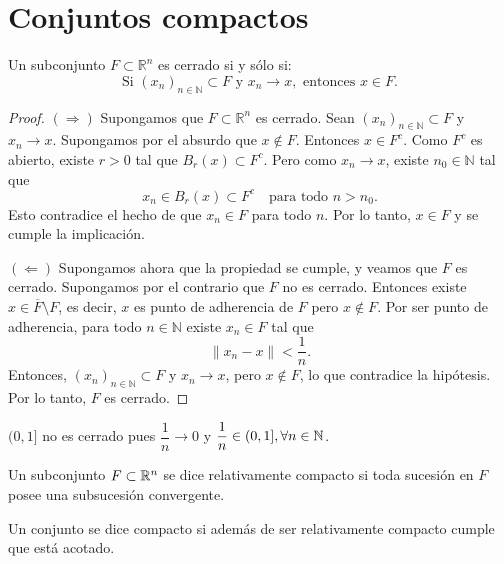 \clearpage
\section{Conjuntos compactos}

\begin{theorem}
  Un subconjunto $F \subset \mathbb{R}^n$ es cerrado si y sólo si:
  $$\text{Si } (x_n)_{n \in \mathbb{N}} \subset F \text{ y } x_n \to x, \text{ entonces } x \in F.$$
  \begin{proof}
    $(\Rightarrow)$ Supongamos que $F \subset \mathbb{R}^n$ es cerrado.
    Sean $(x_n)_{n \in \mathbb{N}} \subset F$ y $x_n \to x$.
    Supongamos por el absurdo que $x \notin F$. Entonces $x \in F^c$.
    Como $F^c$ es abierto, existe $r > 0$ tal que $B_r(x) \subset F^c$.
    Pero como $x_n \to x$, existe $n_0 \in \mathbb{N}$ tal que
    $$x_n \in B_r(x) \subset F^c \quad \text{para todo } n > n_0.$$
    Esto contradice el hecho de que $x_n \in F$ para todo $n$.
    Por lo tanto, $x \in F$ y se cumple la implicación.

    \medskip

    $(\Leftarrow)$ Supongamos ahora que la propiedad se cumple, y veamos que $F$ es cerrado.
    Supongamos por el contrario que $F$ no es cerrado. Entonces existe $x \in \overline{F} \setminus F$,
    es decir, $x$ es punto de adherencia de $F$ pero $x \notin F$.
    Por ser punto de adherencia, para todo $n \in \mathbb{N}$ existe $x_n \in F$ tal que
    $$\|x_n - x\| < \frac{1}{n}.$$
    Entonces, $(x_n)_{n \in \mathbb{N}} \subset F$ y $x_n \to x$, pero $x \notin F$,
    lo que contradice la hipótesis. Por lo tanto, $F$ es cerrado.
  \end{proof}
\end{theorem}

\begin{eg}
  $(0, 1]$ no es cerrado pues $\dfrac{1}{n} \to 0$ y $\dfrac{1}{n} \in (0, 1], \forall n \in \mathbb{N}$.
\end{eg}

\begin{definition}
  Un subconjunto $F \subset \mathbb{R}^n$ se dice relativamente compacto si toda sucesión en $F$ posee una subsucesión convergente.
\end{definition}

\begin{definition}[Compacto]
  Un conjunto se dice compacto si además de ser relativamente compacto cumple que está acotado.
\end{definition}

